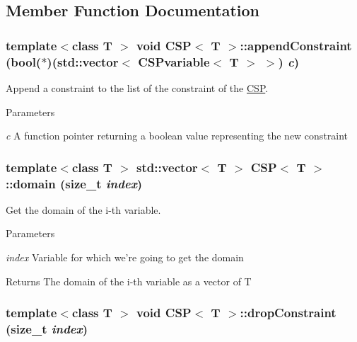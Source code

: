 \subsection{Member Function Documentation}
\hypertarget{classCSP_a8dc6aec6ca7e40d198e58b0ec14fee66}{
\subsubsection[{appendConstraint}]{\setlength{\rightskip}{0pt plus 5cm}template$<$class T $>$ void {\bf CSP}$<$ T $>$::appendConstraint (bool($\ast$)(std::vector$<$ {\bf CSPvariable}$<$ T $>$ $>$) {\em c})}}
\label{classCSP_a8dc6aec6ca7e40d198e58b0ec14fee66}


Append a constraint to the list of the constraint of the \hyperlink{classCSP}{CSP}. 


\begin{DoxyParams}{Parameters}
\item[{\em c}]A function pointer returning a boolean value representing the new constraint \end{DoxyParams}
\hypertarget{classCSP_ae9db774b971c480cbef66168b9b6cf07}{
\subsubsection[{domain}]{\setlength{\rightskip}{0pt plus 5cm}template$<$class T $>$ std::vector$<$ T $>$ {\bf CSP}$<$ T $>$::domain (size\_\-t {\em index})}}
\label{classCSP_ae9db774b971c480cbef66168b9b6cf07}


Get the domain of the i-\/th variable. 


\begin{DoxyParams}{Parameters}
\item[{\em index}]Variable for which we're going to get the domain \end{DoxyParams}
\begin{DoxyReturn}{Returns}
The domain of the i-\/th variable as a vector of T 
\end{DoxyReturn}
\hypertarget{classCSP_a0231b93bceae257f0e1c35041f8fe63f}{
\subsubsection[{dropConstraint}]{\setlength{\rightskip}{0pt plus 5cm}template$<$class T $>$ void {\bf CSP}$<$ T $>$::dropConstraint (size\_\-t {\em index})}}
\label{classCSP_a0231b93bceae257f0e1c35041f8fe63f}


